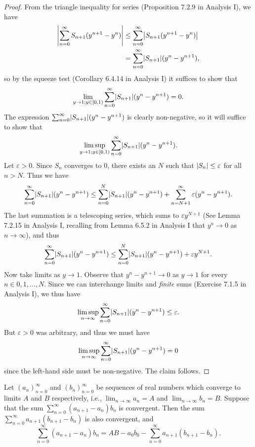 \begin{proof}
    From the triangle inequality for series (Proposition 7.2.9 in Analysis I), we have
    \begin{align*}
        \abs*{\sum_{n = 0}^\infty S_{n + 1} (y^{n + 1} - y^n)} & \leq \sum_{n = 0}^\infty \abs*{S_{n + 1} (y^{n + 1} - y^n)} \\
                                                               & = \sum_{n = 0}^\infty \abs*{S_{n + 1}} (y^n - y^{n + 1}),
    \end{align*}
    so by the squeeze test (Corollary 6.4.14 in Analysis I) it suffices to show that
    \[
        \lim_{y \to 1 ; y \in [0, 1)} \sum_{n = 0}^\infty \abs*{S_{n + 1}} (y^n - y^{n + 1}) = 0.
    \]
    The expression \(\sum_{n = 0}^\infty \abs*{S_{n + 1}} (y^n - y^{n + 1})\) is clearly non-negative, so it will suffice to show that
    \[
        \limsup_{y \to 1 ; y \in [0, 1)} \sum_{n = 0}^\infty \abs*{S_{n + 1}} (y^n - y^{n + 1}).
    \]
    Let \(\varepsilon > 0\).
    Since \(S_n\) converges to \(0\), there exists an \(N\) such that \(\abs*{S_n} \leq \varepsilon\) for all \(n > N\).
    Thus we have
    \[
        \sum_{n = 0}^\infty \abs*{S_{n + 1}} (y^n - y^{n + 1}) \leq \sum_{n = 0}^N \abs*{S_{n + 1}} (y^n - y^{n + 1}) + \sum_{n = N + 1}^\infty \varepsilon (y^n - y^{n + 1}).
    \]
    The last summation is a telescoping series, which sums to \(\varepsilon y^{N + 1}\) (See Lemma 7.2.15 in Analysis I, recalling from Lemma 6.5.2 in Analysis I that \(y^n \to 0\) as \(n \to \infty\)), and thus
    \[
        \sum_{n = 0}^\infty \abs*{S_{n + 1}} (y^n - y^{n + 1}) \leq \sum_{n = 0}^N \abs*{S_{n + 1}} (y^n - y^{n + 1}) + \varepsilon y^{N + 1}.
    \]
    Now take limits as \(y \to 1\).
    Observe that \(y^n - y^{n + 1} \to 0\) as \(y \to 1\) for every \(n \in 0, 1, \dots, N\).
    Since we can interchange limits and \emph{finite} sums (Exercise 7.1.5 in Analysis I), we thus have
    \[
        \limsup_{n \to \infty} \sum_{n = 0}^\infty \abs*{S_{n + 1}} (y^n - y^{n + 1}) \leq \varepsilon.
    \]
    But \(\varepsilon > 0\) was arbitrary, and thus we must have
    \[
        \limsup_{n \to \infty} \sum_{n = 0}^\infty \abs*{S_{n + 1}} (y^n - y^{n + 1}) = 0
    \]
    since the left-hand side must be non-negative.
    The claim follows.
\end{proof}

\begin{lemma}\label{4.3.2}
    Let \((a_n)_{n = 0}^\infty\) and \((b_n)_{n = 0}^\infty\) be sequences of real numbers which converge to limits \(A\) and \(B\) respectively, i.e., \(\lim_{n \to \infty} a_n = A\) and \(\lim_{n \to \infty} b_n = B\).
    Suppose that the sum \(\sum_{n = 0}^\infty (a_{n + 1} - a_n) b_n\) is convergent.
    Then the sum \(\sum_{n = 0}^\infty a_{n + 1} (b_{n + 1} - b_n)\) is also convergent, and
    \[
        \sum_{n = 0}^\infty (a_{n + 1} - a_n) b_n = AB - a_0 b_0 - \sum_{n = 0}^\infty a_{n + 1} (b_{n + 1} - b_n).
    \]
\end{lemma}

